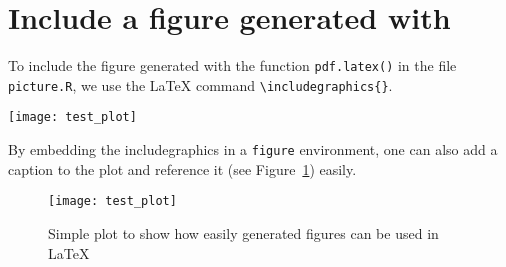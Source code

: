 \documentclass[11pt,a4paper]{article}
\begin{document}
\section{Include a figure generated with \Rp}
To include the figure generated with the \Rp function \texttt{pdf.latex()}
in the file \texttt{picture.R}, we use the \LaTeX{} command
\texttt{\textbackslash includegraphics\{\}}.

\begin{center}
  \texttt{[image: test\_plot]}
\end{center}

By embedding the includegraphics in a \texttt{figure} environment, one can
also add a caption to the plot and reference it (see
Figure~\ref{fig:testfig}) easily. 

\begin{figure}[!h]
  \centering
  \texttt{[image: test\_plot]}
  \label{fig:testfig}
  \caption{Simple plot to show how easily \Rp generated figures can be used
    in \LaTeX{}}
\end{figure}
\end{document}
